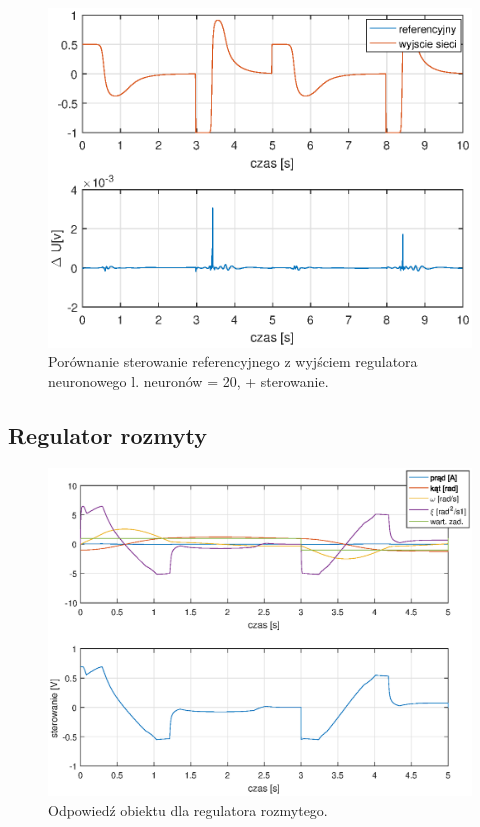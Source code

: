\begin{figure}[h!]
	\centering
	\includegraphics[scale = 0.8]{fig/20neuronU.eps}
	\caption		
	{Porównanie sterowanie referencyjnego z wyjściem regulatora neuronowego l. neuronów = 20, + sterowanie.}
	\label{20nU}
\end{figure}

\FloatBarrier
\newpage

\subsection{Regulator rozmyty}

\begin{figure}[h!]
	\centering
	\includegraphics[scale = 0.8]{fig/fuzzy_odp.eps}
	\caption		
	{Odpowied\'z obiektu dla regulatora rozmytego.}
	\label{fuzzyOdp}
\end{figure}
	
